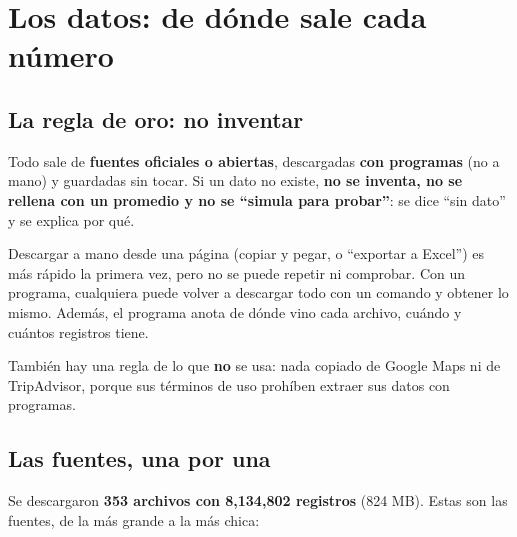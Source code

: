 \chapter{Los datos: de dónde sale cada número}
\label{cap:s-datos}

\section{La regla de oro: no inventar}
Todo sale de \textbf{fuentes oficiales o abiertas}, descargadas \textbf{con programas} (no a mano) y guardadas sin
tocar. Si un dato no existe, \textbf{no se inventa, no se rellena con un promedio y no se ``simula para probar''}: se dice
``sin dato'' y se explica por qué.

\begin{porque}
Descargar a mano desde una página (copiar y pegar, o ``exportar a Excel'') es más rápido la primera vez, pero no se puede
repetir ni comprobar. Con un programa, cualquiera puede volver a descargar todo con un comando y obtener lo mismo. Además,
el programa anota de dónde vino cada archivo, cuándo y cuántos registros tiene.
\end{porque}

También hay una regla de lo que \textbf{no} se usa: nada copiado de Google Maps ni de TripAdvisor, porque sus términos de
uso prohíben extraer sus datos con programas.

\section{Las fuentes, una por una}
Se descargaron \textbf{353 archivos con 8,134,802 registros} (824 MB). Estas son las fuentes, de la más grande a la más
chica:

